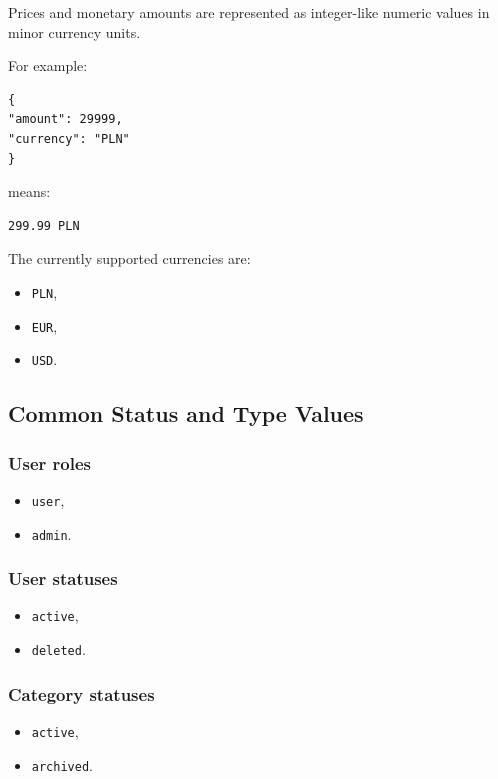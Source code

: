 Prices and monetary amounts are represented as integer-like numeric values in minor currency units.

For example:

\begin{verbatim}
{
"amount": 29999,
"currency": "PLN"
}
\end{verbatim}

means:

\begin{verbatim}
299.99 PLN
\end{verbatim}

The currently supported currencies are:

\begin{itemize}
    \item \texttt{PLN},
    \item \texttt{EUR},
    \item \texttt{USD}.
\end{itemize}

\subsection{Common Status and Type Values}

\subsubsection{User roles}

\begin{itemize}
    \item \texttt{user},
    \item \texttt{admin}.
\end{itemize}

\subsubsection{User statuses}

\begin{itemize}
    \item \texttt{active},
    \item \texttt{deleted}.
\end{itemize}

\subsubsection{Category statuses}

\begin{itemize}
    \item \texttt{active},
    \item \texttt{archived}.
\end{itemize}


